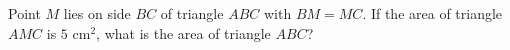 Point $M$ lies on side $BC$ of triangle $ABC$ with $BM=MC$. If the area of triangle $AMC$ is $5\text{ cm}^2$, what is the area of triangle $ABC$?
